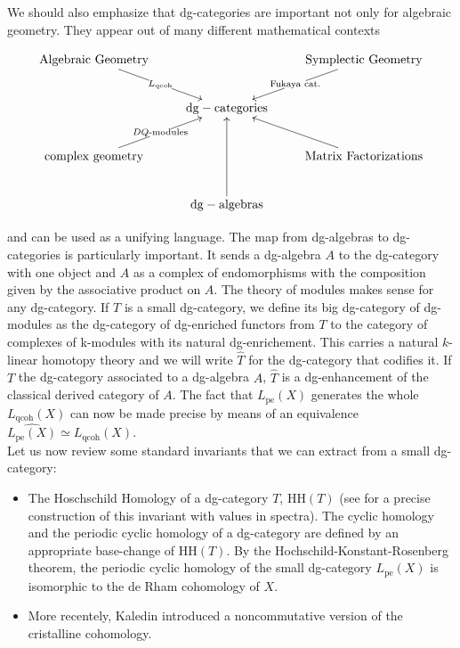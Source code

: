 \begin{refsection}
We should also emphasize that dg-categories are important not only for algebraic geometry. They appear out of many different mathematical contexts

\[
\xymatrix{
\text{Algebraic Geometry}\ar[dr]|-{L_{\mathrm{qcoh}}} && \text{Symplectic Geometry} \ar[dl]|-{\text{Fukaya cat.}} \\
& \mathrm{dg - categories} & \\
\text{complex geometry}\ar[ur]|-{DQ\textrm{-modules}}&& \text{Matrix Factorizations}\ar[ul]\\
& \mathrm{dg - algebras} \ar[uu]
}
\]

\noindent and can be used as a unifying language. The map from dg-algebras to dg-categories is particularly important. It sends a dg-algebra $A$ to the dg-category with one object and $A$ as a complex of endomorphisms with the composition given by the associative product on $A$. The theory of modules makes sense for any dg-category. If $T$ is a small dg-category, we define its big dg-category of dg-modules as the dg-category of  dg-enriched functors from $T$ to the category of complexes of k-modules with its natural dg-enrichement. This carries a natural $k$-linear homotopy theory and we will write $\widehat{T}$ for the dg-category that codifies it.  If $T$ the dg-category associated to a dg-algebra $A$, $\widehat{T}$ is a dg-enhancement of the classical derived category of $A$. The fact that $L_\mathrm{pe}(X)$ generates the whole $L_{\mathrm{qcoh}}(X)$ can now be made precise by means of an equivalence  $\widehat{L_\mathrm{pe}(X)}\simeq  L_{\mathrm{qcoh}}(X)$. \\


Let us now review some standard invariants that we can extract from a small dg-category:

\begin{itemize}
\item The Hoschschild Homology of a dg-category $T$, $\mathrm{HH}(T)$ (see \cite{Anthony-thesis} for a precise construction of this invariant with values in spectra). The cyclic homology and the periodic cyclic homology of a dg-category are defined by an appropriate base-change of $\mathrm{HH}(T)$. By the Hochschild-Konstant-Rosenberg theorem, the periodic cyclic homology of the small dg-category  $L_\mathrm{pe}(X)$ is isomorphic to the de Rham cohomology of $X$.

\item More recentely, Kaledin \cite{kaledin} introduced a noncommutative version of the cristalline cohomology.


\end{itemize}
\end{refsection}
